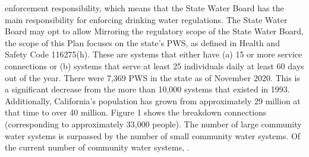 enforcement responsibility, which means that the State Water Board has the main responsibility for enforcing drinking water regulations.
 The State Water Board may opt to allow 
Mirroring the regulatory scope of the State Water Board, the scope of this Plan focuses on the state’s PWS, as defined in Health and Safety Code 116275(h). These are systems that either have (a) 15 or more service connections or (b) systems that serve at least 25 individuals daily at least 60 days out of
the year. There were 7,369 PWS in the state as of November 2020. This is a significant decrease from the more than 10,000 systems that existed in 1993. Additionally, California’s population has grown from approximately 29 million at that time to over 40 million.
Figure 1 shows the breakdown  connections (corresponding to approximately 33,000 people). The number of large community water systems is surpassed by the number of small community water systems.
Of the current number of community water systems, .


